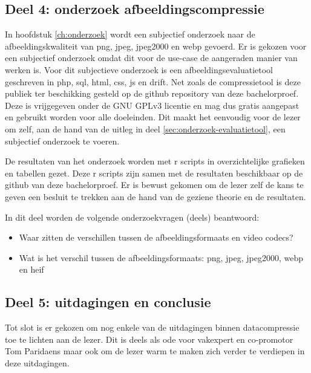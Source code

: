 \subsection{Deel 4: onderzoek afbeeldingscompressie}
\label{sec:aanpak-bachelorproef-deel-4}

In hoofdstuk \ref{ch:onderzoek} wordt een subjectief onderzoek naar de afbeeldingskwaliteit van \gls{png}, \gls{jpeg}, \gls{jpeg2000} en \gls{webp} gevoerd. Er is gekozen voor een subjectief onderzoek omdat dit voor de \gls{use-case} de aangeraden manier van werken is. Voor dit subjectieve onderzoek is een \gls{afbeeldingsevaluatietool} geschreven in \gls{php}, \gls{sql}, \gls{html}, \gls{css}, \gls{js} en \gls{drift}. Net zoals de \gls{compressietool} is deze publiek ter beschikking gesteld op de \gls{github} repository van deze bachelorproef. Deze is vrijgegeven onder de GNU GPLv3 licentie en mag dus gratis aangepast en gebruikt worden voor alle doeleinden. Dit maakt het eenvoudig voor de lezer om zelf, aan de hand van de uitleg in deel \ref{sec:onderzoek-evaluatietool}, een subjectief onderzoek te voeren.

De resultaten van het onderzoek worden met \gls{r} scripts in overzichtelijke grafieken en tabellen gezet. Deze \gls{r} scripts zijn samen met de resultaten beschikbaar op de \gls{github} van deze bachelorproef. Er is bewust gekomen om de lezer zelf de kans te geven een besluit te trekken aan de hand van de geziene theorie en de resultaten.


In dit deel worden de volgende onderzoekvragen (deels) beantwoord: 
\begin{itemize}
	\item Waar zitten de verschillen tussen de \glspl{afbeeldingsformaat} en video \glspl{codec}?
	\item Wat is het verschil tussen de \glspl{afbeeldingsformaat}: \gls{png}, \gls{jpeg}, \gls{jpeg2000}, \gls{webp} en \gls{heif}
\end{itemize}

\subsection{Deel 5: uitdagingen en conclusie}
\label{sec:aanpak-bachelorproef-deel-5}

Tot slot is er gekozen om nog enkele van de uitdagingen binnen \gls{datacompressie} toe te lichten aan de lezer. Dit is deels als ode voor vakexpert en co-promotor Tom Paridaens maar ook om de lezer warm te maken zich verder te verdiepen in deze uitdagingen.

